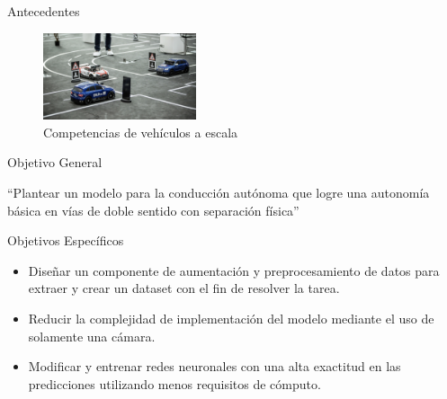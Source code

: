 \documentclass[10pt, usepdftitle=false]{beamer}
\begin{document}
\begin{frame}[fragile]{Antecedentes}
	\begin{figure}[H]
		\captionsetup[subfloat]{labelformat=empty}
		\centering
	\end{figure}
	
	\begin{figure}[H]
		\captionsetup{labelformat=empty}
		\centering
		\includegraphics[width=4.5cm]{imagenes/audi}
		\caption{Competencias de vehículos a escala}
	\end{figure}
\end{frame}

\begin{frame}[fragile]{Objetivo General}
	\begin{center}
		\Large
		``Plantear un modelo para la conducción autónoma que logre una autonomía básica en vías de doble sentido con separación física''
	\end{center}
\end{frame}

\begin{frame}[fragile]{Objetivos Específicos}
	\begin{itemize}[<+-|alert@+>]
		\item Diseñar un componente de aumentación y preprocesamiento de datos para extraer y crear un dataset con el fin de resolver la tarea.
		\item Reducir la complejidad de implementación del modelo mediante el uso de solamente una cámara.
		\item Modificar y entrenar redes neuronales con una alta exactitud en las predicciones utilizando menos requisitos de cómputo.
	\end{itemize}
\end{frame}
\end{document}
